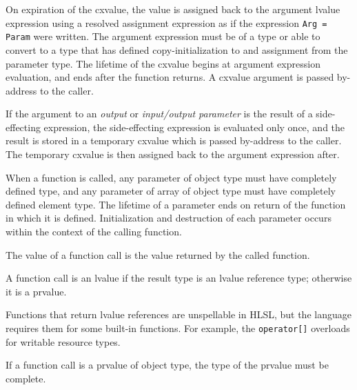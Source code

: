 \p On expiration of the cxvalue, the value is assigned back to the argument
lvalue expression using a resolved assignment expression as if the expression
\texttt{Arg = Param} were written. The argument expression must be of a type or
able to convert to a type that has defined copy-initialization to and assignment
from the parameter type. The lifetime of the cxvalue begins at argument
expression evaluation, and ends after the function returns. A cxvalue argument
is passed by-address to the caller.

\begin{note}
  If the argument to an \textit{output} or \textit{input/output parameter} is
  the result of a side-effecting expression, the side-effecting expression is
  evaluated only once, and the result is stored in a temporary cxvalue which is
  passed by-address to the caller. The temporary cxvalue is then assigned back
  to the argument expression after.
\end{note}

\p When a function is called, any parameter of object type must have completely
defined type, and any parameter of array of object type must have completely
defined element type. The lifetime of a parameter ends on return of the function
in which it is defined. Initialization and destruction of each
parameter occurs within the context of the calling function.

\p The value of a function call is the value returned by the called function.

\p A function call is an lvalue if the result type is an lvalue reference type;
otherwise it is a prvalue.

\begin{note}
  Functions that return lvalue references are unspellable in HLSL, but the
  language requires them for some built-in functions. For example, the
  \texttt{operator[]} overloads for writable resource types.
\end{note}

\p If a function call is a prvalue of object type, the type of the prvalue must
be complete.
